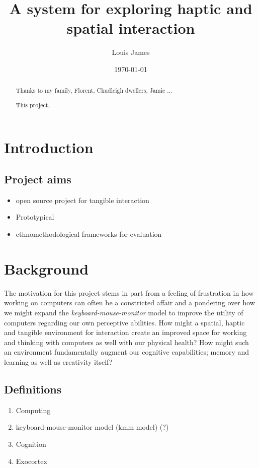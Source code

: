 \documentclass[12pt]{report}
\author{Louis James}
\date{\today}
\title{A system for exploring haptic and spatial interaction}
\begin{document}
\maketitle

\renewcommand{\abstractname}{Acknowledgements}
\begin{abstract}
 Thanks to my family, Florent, Chudleigh dwellers, Jamie ...
\end{abstract}
\newpage


\renewcommand{\abstractname}{Abstract}
\begin{abstract}
This project\ldots{}
\end{abstract}
\tableofcontents
\listoffigures
\chapter{Introduction}
\label{sec:org746e86a}

\section{Project aims}
\label{sec:org9c633a8}

\begin{itemize}
\item open source project for tangible interaction
\item Prototypical
\item ethnomethodological frameworks for evaluation
\end{itemize}

\chapter{Background}
\label{sec:orgd7518c3}

The motivation for this project stems in part from a feeling of frustration in
 how working on computers can often be a constricted affair and a pondering over
 how we might expand the \emph{keyboard-mouse-monitor} model to improve the utility
 of computers regarding our own perceptive abilities. How might a spatial,
 haptic and tangible environment for interaction create an improved space for
 working and thinking with computers as well with our physical health? How might
 such an environment fundamentally augment our cognitive capabilities; memory
 and learning as well as creativity itself?

\section{Definitions}
\label{sec:orga2707ad}
\begin{enumerate}
\item Computing
\label{sec:org26c3090}
\item keyboard-mouse-monitor model (kmm model) (?)
\label{sec:orgf9cfedc}
\item Cognition
\label{sec:org1860a4a}
\item Exocortex
\label{sec:org9f88f79}
\end{enumerate}
\end{document}
